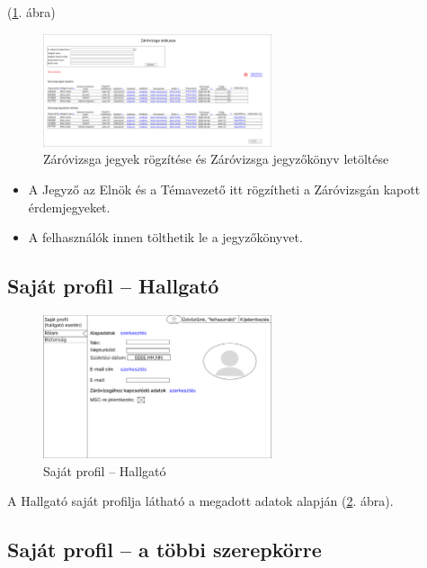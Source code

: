 \documentclass[a4paper,12pt]{article}
\begin{document}
(\ref{fig:Zv_Status}. ábra)

\begin{figure}[h!]
	\centering
	\includegraphics[width=0.6\textwidth]{images/Web_pages/Zv_Status.png}
	\caption{Záróvizsga jegyek rögzítése és Záróvizsga jegyzőkönyv letöltése}
	\label{fig:Zv_Status}
\end{figure}

\begin{itemize}
	\item A Jegyző az Elnök és a Témavezető itt rögzítheti a Záróvizsgán kapott érdemjegyeket.
	\item A felhasználók innen tölthetik le a jegyzőkönyvet.
\end{itemize}

\subsection{Saját profil -- Hallgató}

\begin{figure}[h!]
	\centering
	\includegraphics[width=0.6\textwidth]{images/Web_pages/My_Profile_Student.jpg}
	\caption{Saját profil -- Hallgató}
	\label{fig:My_Profile_Student}
\end{figure}

A Hallgató saját profilja látható a megadott adatok alapján (\ref{fig:My_Profile_Student}. ábra).

\subsection{Saját profil -- a többi szerepkörre}
\end{document}
